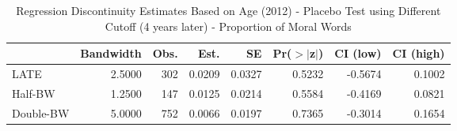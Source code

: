 \begin{table}[ht]
\centering
\begin{tabular}{lrrrrrrr}
  \hline
 & Bandwidth & Obs. & Est. & SE & Pr($>$$|$z$|$) & CI (low) & CI (high) \\ 
  \hline
LATE & 2.5000 & 302 & 0.0209 & 0.0327 & 0.5232 & -0.5674 & 0.1002 \\ 
  Half-BW & 1.2500 & 147 & 0.0125 & 0.0214 & 0.5584 & -0.4169 & 0.0821 \\ 
  Double-BW & 5.0000 & 752 & 0.0066 & 0.0197 & 0.7365 & -0.3014 & 0.1654 \\ 
   \hline
\end{tabular}
\caption{Regression Discontinuity Estimates Based on Age (2012) - Placebo Test using Different Cutoff (4 years later) - Proportion of Moral Words} 
\label{tab:Xrd2012y_plac}
\end{table}
